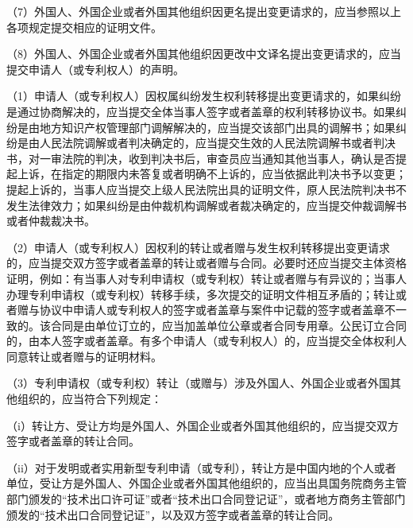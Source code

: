 {\setlength{\parindent}{17.1bp}（7）外国人、外国企业或者外国其他组织因更名提出变更请求的，应当参照以上各项规定提交相应的证明文件。\par}

{\setlength{\parindent}{17.1bp}（8）外国人、外国企业或者外国其他组织因更改中文译名提出变更请求的，应当提交申请人（或专利权人）的声明。\par}

{\setlength{\parindent}{17.1bp}（1）申请人（或专利权人）因权属纠纷发生权利转移提出变更请求的，如果纠纷是通过协商解决的，应当提交全体当事人签字或者盖章的权利转移协议书。如果纠纷是由地方知识产权管理部门调解解决的，应当提交该部门出具的调解书；如果纠纷是由人民法院调解或者判决确定的，应当提交生效的人民法院调解书或者判决书，对一审法院的判决，收到判决书后，审查员应当通知其他当事人，确认是否提起上诉，在指定的期限内未答复或者明确不上诉的，应当依据此判决书予以变更；提起上诉的，当事人应当提交上级人民法院出具的证明文件，原人民法院判决书不发生法律效力；如果纠纷是由仲裁机构调解或者裁决确定的，应当提交仲裁调解书或者仲裁裁决书。\par}

{\setlength{\parindent}{17.1bp}（2）申请人（或专利权人）因权利的转让或者赠与发生权利转移提出变更请求的，应当提交双方签字或者盖章的转让或者赠与合同。必要时还应当提交主体资格证明，例如：有当事人对专利申请权（或专利权）转让或者赠与有异议的；当事人办理专利申请权（或专利权）转移手续，多次提交的证明文件相互矛盾的；转让或者赠与协议中申请人或专利权人的签字或者盖章与案件中记载的签字或者盖章不一致的。该合同是由单位订立的，应当加盖单位公章或者合同专用章。公民订立合同的，由本人签字或者盖章。有多个申请人（或专利权人）的，应当提交全体权利人同意转让或者赠与的证明材料。\par}

{\setlength{\parindent}{17.1bp}（3）专利申请权（或专利权）转让（或赠与）涉及外国人、外国企业或者外国其他组织的，应当符合下列规定：\par}

{\setlength{\parindent}{17.1bp}（i）转让方、受让方均是外国人、外国企业或者外国其他组织的，应当提交双方签字或者盖章的转让合同。\par}

{\setlength{\parindent}{17.1bp}（ii）对于发明或者实用新型专利申请（或专利），转让方是中国内地的个人或者单位，受让方是外国人、外国企业或者外国其他组织的，应当出具国务院商务主管部门颁发的“技术出口许可证”或者“技术出口合同登记证”，或者地方商务主管部门颁发的“技术出口合同登记证”，以及双方签字或者盖章的转让合同。\par}

